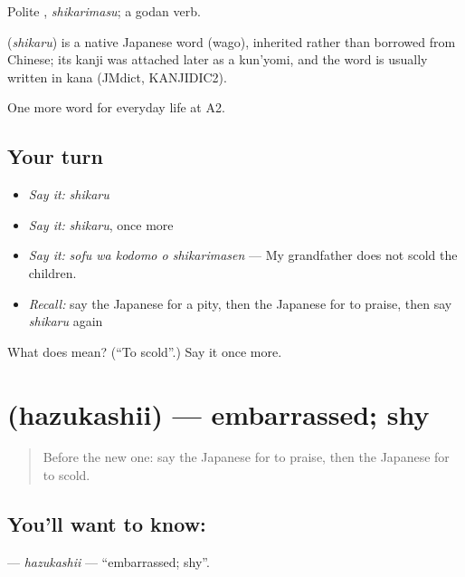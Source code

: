 Polite \textbf{}, \emph{shikarimasu}; a godan verb.

\begin{cousinweb}
\textbf{} (\emph{shikaru}) is a native Japanese word (wago), inherited rather than borrowed from Chinese; its kanji was attached later as a kun'yomi, and the word is usually written in kana (JMdict, KANJIDIC2).
\end{cousinweb}

\begin{grammarlens}[title={What you've built}]
One more word for everyday life at A2.
\end{grammarlens}

\subsection*{Your turn}
\begin{itemize}
\raggedright
  \item \emph{Say it:} \emph{shikaru}
  \item \emph{Say it:} \emph{shikaru}, once more
  \item \emph{Say it:} \emph{sofu wa kodomo o shikarimasen} — My grandfather does not scold the children.
  \item \emph{Recall:} say the Japanese for a pity, then the Japanese for to praise, then say \emph{shikaru} again
\end{itemize}

\begin{tcolorbox}[breakable,colback=teal!4,colframe=teal!35!black,title={Before you move on}]
What does  mean? (\textquotedblleft{}To scold\textquotedblright{}.) Say it once more.
\end{tcolorbox}
\section[\texorpdfstring{\ja{はずかしい} (hazukashii)}{はずかしい (hazukashii)}]{ (hazukashii) — embarrassed; shy}

\label{lesson:JA-C247-hazukashii}



\begin{quote}
Before the new one: say the Japanese for to praise, then the Japanese for to scold.
\end{quote}

\subsection*{You'll want to know: }
\textbf{} — \emph{hazukashii} — \textquotedblleft{}embarrassed; shy\textquotedblright{}.

